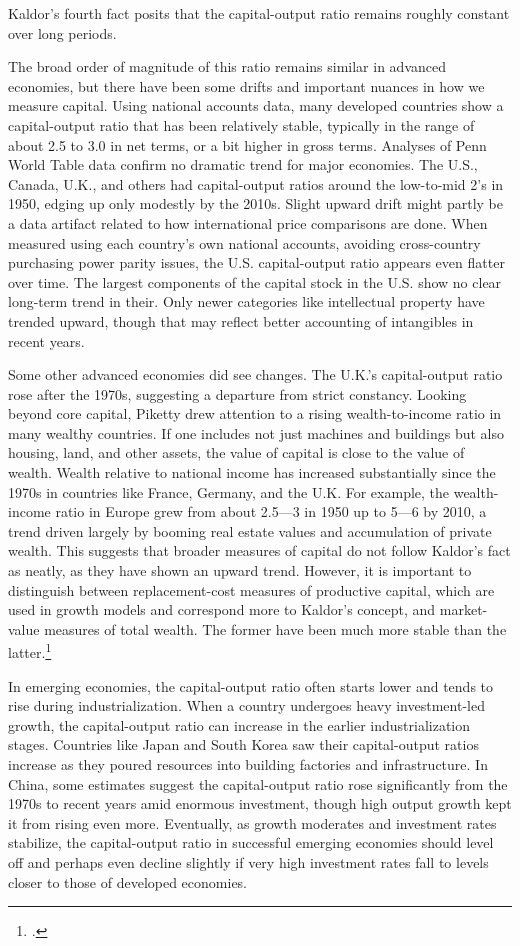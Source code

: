 \documentclass[\topdir/lecture\_notes.tex]{subfiles}
\begin{document}
Kaldor's fourth fact posits that the capital-output ratio remains roughly constant over long periods.

The broad order of magnitude of this ratio remains similar in advanced economies, but there have been some drifts and important nuances in how we measure capital.
Using national accounts data, many developed countries show a capital-output ratio that has been relatively stable, typically in the range of about 2.5 to 3.0 in net terms, or a bit higher in gross terms.
Analyses of Penn World Table data confirm no dramatic trend for major economies.
The U.S., Canada, U.K., and others had capital-output ratios around the low-to-mid 2's in 1950, edging up only modestly by the 2010s.
Slight upward drift might partly be a data artifact related to how international price comparisons are done.
When measured using each country's own national accounts, avoiding cross-country purchasing power parity issues, the U.S. capital-output ratio appears even flatter over time.
The largest components of the capital stock in the U.S. show no clear long-term trend in their.
Only newer categories like intellectual property have trended upward, though that may reflect better accounting of intangibles in recent years.

Some other advanced economies did see changes.
The U.K.'s capital-output ratio rose after the 1970s, suggesting a departure from strict constancy.
Looking beyond core capital, Piketty drew attention to a rising wealth-to-income ratio in many wealthy countries.
If one includes not just machines and buildings but also housing, land, and other assets, the value of capital is close to the value of wealth.
Wealth relative to national income has increased substantially since the 1970s in countries like France, Germany, and the U.K.
For example, the wealth-income ratio in Europe grew from about 2.5---3 in 1950 up to 5---6 by 2010, a trend driven largely by booming real estate values and accumulation of private wealth.
This suggests that broader measures of capital do not follow Kaldor's fact as neatly, as they have shown an upward trend.
However, it is important to distinguish between replacement-cost measures of productive capital, which are used in growth models and correspond more to Kaldor's concept, and market-value measures of total wealth.
The former have been much more stable than the latter.\footnote{\textcite{herrendorf2014growth,piketty2014capital}.}

In emerging economies, the capital-output ratio often starts lower and tends to rise during industrialization.
When a country undergoes heavy investment-led growth, the capital-output ratio can increase in the earlier industrialization stages.
Countries like Japan and South Korea saw their capital-output ratios increase as they poured resources into building factories and infrastructure.
In China, some estimates suggest the capital-output ratio rose significantly from the 1970s to recent years amid enormous investment, though high output growth kept it from rising even more.
Eventually, as growth moderates and investment rates stabilize, the capital-output ratio in successful emerging economies should level off and perhaps even decline slightly if very high investment rates fall to levels closer to those of developed economies.
\end{document}
